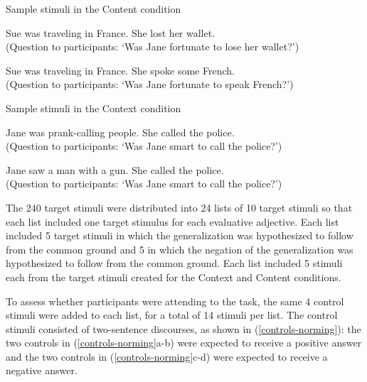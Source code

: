 \documentclass[11pt,fleqn]{article}
\newcommand{\6}{\mbox{$[\hspace*{-.6mm}[$}}
\newcommand{\9}{\mbox{$]\hspace*{-.6mm}]$}}
\begin{document}
\begin{exe}
\ex\label{cont-norm} Sample stimuli in the Content condition 

\begin{xlist}
\ex Sue was traveling in France. She lost her wallet. \\ (Question to  participants: `Was Jane fortunate to lose her wallet?')

\ex Sue was traveling in France. She spoke some French. \\ (Question to participants: `Was Jane fortunate to speak French?')

\end{xlist}

\ex\label{context-norm} Sample stimuli in the Context condition

\begin{xlist}
\ex Jane was prank-calling people. She called the police. \\ (Question to participants: `Was Jane smart to call the police?')

\ex Jane saw a man with a gun. She called the police. \\ (Question to participants: `Was Jane smart to call the police?')
\end{xlist}
\end{exe}

The 240 target stimuli were distributed into 24 lists of 10 target stimuli so that each list included one target stimulus for each evaluative adjective. Each list included 5 target stimuli in which the generalization was hypothesized to follow from the common ground and 5 in which the negation of the generalization was hypothesized to follow from the common ground. Each list included 5 stimuli each from the target stimuli created for the Context and Content conditions.

To assess whether participants were attending to the task, the same 4 control stimuli were added to each list, for a total of 14 stimuli per list. The control stimuli consisted of two-sentence discourses, as shown in (\ref{controls-norming}): the two controls in (\ref{controls-norming}a-b) were expected to receive a positive answer and the two controls in (\ref{controls-norming}c-d) were expected to receive a negative answer.
\end{document}
